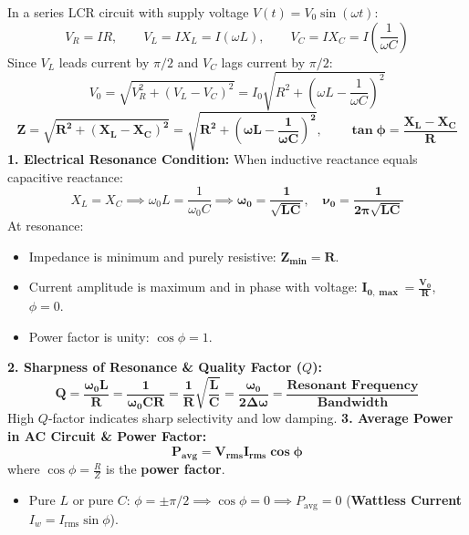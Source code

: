 \documentclass[10pt,twoside,openright]{book}
\begin{document}
\begin{formulabox}
In a series LCR circuit with supply voltage $V(t) = V_0 \sin(\omega t)$:
\begin{equation}
  V_R = I R, \qquad V_L = I X_L = I (\omega L), \qquad V_C = I X_C = I \left(\frac{1}{\omega C}\right)
\end{equation}
Since $V_L$ leads current by $\pi/2$ and $V_C$ lags current by $\pi/2$:
\begin{equation}
  V_0 = \sqrt{V_R^2 + (V_L - V_C)^2} = I_0 \sqrt{R^2 + \left(\omega L - \frac{1}{\omega C}\right)^2}
\end{equation}
\begin{equation}
  \mathbf{Z = \sqrt{R^2 + (X_L - X_C)^2} = \sqrt{R^2 + \left(\omega L - \frac{1}{\omega C}\right)^2}}, \qquad \mathbf{\tan\phi = \frac{X_L - X_C}{R}}
\end{equation}
\textbf{1. Electrical Resonance Condition:}
When inductive reactance equals capacitive reactance:
\begin{equation}
  X_L = X_C \implies \omega_0 L = \frac{1}{\omega_0 C} \implies \mathbf{\omega_0 = \frac{1}{\sqrt{LC}}}, \quad \mathbf{\nu_0 = \frac{1}{2\pi\sqrt{LC}}}
\end{equation}
At resonance:
\begin{itemize}
  \item Impedance is minimum and purely resistive: $\mathbf{Z_{\min} = R}$.
  \item Current amplitude is maximum and in phase with voltage: $\mathbf{I_{0,\max} = \frac{V_0}{R}}$, $\phi = 0$.
  \item Power factor is unity: $\cos\phi = 1$.
\end{itemize}
\textbf{2. Sharpness of Resonance \& Quality Factor ($Q$):}
\begin{equation}
  \mathbf{Q = \frac{\omega_0 L}{R} = \frac{1}{\omega_0 C R} = \frac{1}{R}\sqrt{\frac{L}{C}} = \frac{\omega_0}{2\Delta\omega} = \frac{\text{Resonant Frequency}}{\text{Bandwidth}}}
\end{equation}
High $Q$-factor indicates sharp selectivity and low damping.
\textbf{3. Average Power in AC Circuit \& Power Factor:}
\begin{equation}
  \mathbf{P_{\text{avg}} = V_{\text{rms}} I_{\text{rms}} \cos\phi}
\end{equation}
where $\cos\phi = \frac{R}{Z}$ is the \textbf{power factor}.
\begin{itemize}
  \item Pure $L$ or pure $C$: $\phi = \pm \pi/2 \implies \cos\phi = 0 \implies P_{\text{avg}} = 0$ (\textbf{Wattless Current} $I_w = I_{\text{rms}} \sin\phi$).

\end{itemize}
\end{formulabox}
\end{document}
